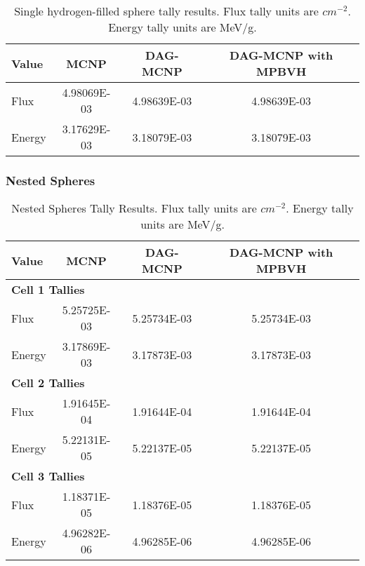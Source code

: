   \begin{table}[H]
    \small
    \begin{center}
      \begin{tabular}{lccc}
        \toprule
        Value & MCNP & DAG-MCNP & DAG-MCNP with MPBVH \\
        \toprule
        \hline
        Flux   & 4.98069E-03 & 4.98639E-03 & 4.98639E-03 \\
        Energy & 3.17629E-03 & 3.18079E-03 & 3.18079E-03 \\
        \bottomrule
      \end{tabular}
      \caption[Single hydrogen-filled sphere tally results.]{Single
        hydrogen-filled sphere tally results. Flux tally units are
        $cm^{-2}$. Energy tally units are MeV/g.}
      \label{nestedspheres}
    \end{center}
  \end{table}

  \subsubsection{Nested Spheres}

  \begin{table}[H]
    \small
    \begin{center}
      \begin{tabular}{lccc}
        \toprule
        Value & MCNP & DAG-MCNP & DAG-MCNP with MPBVH \\
        \toprule
        \multicolumn{4}{l}{\textbf{Cell 1 Tallies}} \\
        \hline
        Flux   & 5.25725E-03 & 5.25734E-03 & 5.25734E-03 \\
        Energy & 3.17869E-03 & 3.17873E-03 & 3.17873E-03 \\
        \hline
        \multicolumn{4}{l}{\textbf{Cell 2 Tallies}}      \\
        \hline
        Flux   & 1.91645E-04 & 1.91644E-04 & 1.91644E-04 \\
        Energy & 5.22131E-05 & 5.22137E-05 & 5.22137E-05 \\
        \hline
        \multicolumn{4}{l}{\textbf{Cell 3 Tallies}}      \\
        \hline
        Flux   & 1.18371E-05 & 1.18376E-05 & 1.18376E-05 \\
        Energy & 4.96282E-06 & 4.96285E-06 & 4.96285E-06 \\
        \bottomrule
      \end{tabular}
      \caption[Nested Spheres Tally Results.]{Nested Spheres Tally Results. Flux
        tally units are $cm^{-2}$. Energy tally units are MeV/g.}
      \label{nestedspheres}
    \end{center}
  \end{table}

